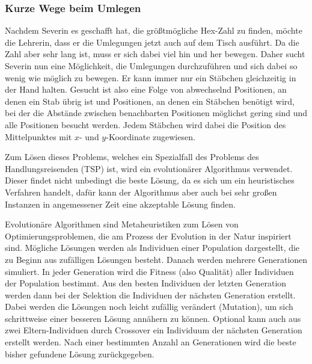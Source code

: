 \documentclass[a4paper,10pt,ngerman]{scrartcl}
\begin{document}
\subsubsection{Kurze Wege beim Umlegen}
Nachdem Severin es geschafft hat, die größtmögliche Hex-Zahl zu finden, möchte die Lehrerin, dass er die Umlegungen jetzt auch auf dem Tisch ausführt. Da die Zahl aber sehr lang ist, muss er sich dabei viel hin und her bewegen. Daher sucht Severin nun eine Möglichkeit, die Umlegungen durchzuführen und sich dabei so wenig wie möglich zu bewegen. 
Er kann immer nur ein Stäbchen gleichzeitig in der Hand halten.
Gesucht ist also eine Folge von abwechselnd Positionen, an denen ein Stab übrig ist und Positionen, an denen ein Stäbchen benötigt wird, bei der die Abstände zwischen benachbarten Positionen möglichst gering sind und alle Positionen besucht werden.
Jedem Stäbchen wird dabei die Position des Mittelpunktes mit $x$- und $y$-Koordinate zugewiesen. 

Zum Lösen dieses Problems, welches ein Spezialfall des Problems des Handlungsreisenden (TSP) ist, wird ein evolutionärer Algorithmus verwendet. 
Dieser findet nicht unbedingt die beste Lösung, da es sich um ein heuristisches Verfahren handelt, dafür kann der Algorithmus aber auch bei sehr großen Instanzen in angemessener Zeit eine akzeptable Lösung finden. 

Evolutionäre Algorithmen sind Metaheuristiken zum Lösen von Optimierungsproblemen, die am Prozess der Evolution in der Natur inspiriert sind. 
Mögliche Lösungen werden als Individuen einer Population dargestellt, die zu Beginn aus zufälligen Lösungen besteht. 
Danach werden mehrere Generationen simuliert. 
In jeder Generation wird die Fitness (also Qualität) aller Individuen der Population bestimmt.
Aus den besten Individuen der letzten Generation werden dann bei der Selektion die Individuen der nächsten Generation erstellt. 
Dabei werden die Lösungen noch leicht zufällig verändert (Mutation), um sich schrittweise einer besseren Lösung annähern zu können.
Optional kann auch aus zwei Eltern-Individuen durch Crossover ein Individuum der nächsten Generation erstellt werden. 
Nach einer bestimmten Anzahl an Generationen wird die beste bisher gefundene Lösung zurückgegeben.
\end{document}
